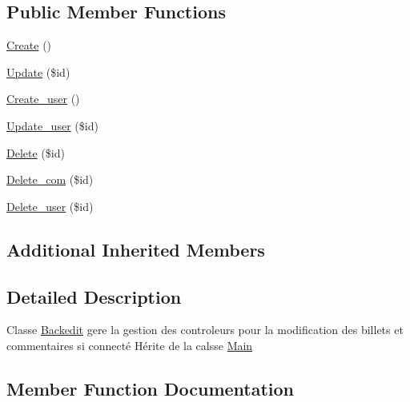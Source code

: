 \subsection*{Public Member Functions}
\begin{DoxyCompactItemize}
\item 
\hyperlink{class_src_1_1_controllers_1_1_backedit_ad01f71fa0ecc039494e3c282864298c3}{Create} ()
\item 
\hyperlink{class_src_1_1_controllers_1_1_backedit_a82232b33fbfacdbdb8a8f49acaecf564}{Update} (\$id)
\item 
\hyperlink{class_src_1_1_controllers_1_1_backedit_af3369c06390987c5f54b6bc444c615ee}{Create\+\_\+user} ()
\item 
\hyperlink{class_src_1_1_controllers_1_1_backedit_ac76a9db7f422d94f155c99c21540da0e}{Update\+\_\+user} (\$id)
\item 
\hyperlink{class_src_1_1_controllers_1_1_backedit_a59113b5ecd1d155db6a4f30af34a1e80}{Delete} (\$id)
\item 
\hyperlink{class_src_1_1_controllers_1_1_backedit_a38147e014898a3417c74b23e903621b0}{Delete\+\_\+com} (\$id)
\item 
\hyperlink{class_src_1_1_controllers_1_1_backedit_ac8f9af14ff73b939d55940eb2ff886ee}{Delete\+\_\+user} (\$id)
\end{DoxyCompactItemize}
\subsection*{Additional Inherited Members}


\subsection{Detailed Description}
Classe \hyperlink{class_src_1_1_controllers_1_1_backedit}{Backedit} gere la gestion des controleurs pour la modification des billets et commentaires si connecté Hérite de la calsse \hyperlink{class_src_1_1_controllers_1_1_main}{Main} 

\subsection{Member Function Documentation}
\mbox{\label{class_src_1_1_controllers_1_1_backedit_ad01f71fa0ecc039494e3c282864298c3}} 

